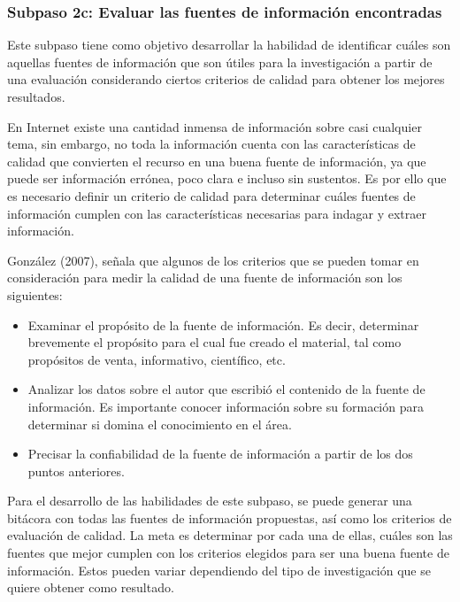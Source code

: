
\subsubsection{Subpaso 2c: Evaluar las fuentes de información encontradas}
\label{secPaso2cCap2}

Este subpaso tiene como objetivo desarrollar la habilidad de identificar cuáles son aquellas fuentes de información que son útiles para la investigación a partir de una evaluación considerando ciertos criterios de calidad para obtener los mejores resultados.

En Internet existe una cantidad inmensa de información sobre casi cualquier tema, sin embargo, no toda la información cuenta con las características de calidad que convierten el recurso en una buena fuente de información, ya que puede ser información errónea, poco clara e incluso sin sustentos. Es por ello que es necesario definir un criterio de calidad para determinar cuáles fuentes de información cumplen con las características necesarias para indagar y extraer información.

González (2007), señala que algunos de los criterios que se pueden tomar en consideración para medir la calidad de una fuente de información son los siguientes:

\begin{itemize}
  \item Examinar el propósito de la fuente de información. Es decir, determinar brevemente el propósito para el cual fue creado el material, tal como propósitos de venta, informativo, científico, etc.
  \item Analizar los datos sobre el autor que escribió el contenido de la fuente de información. Es importante conocer información sobre su formación para determinar si domina el conocimiento en el área.
  \item Precisar la confiabilidad de la fuente de información a partir de los dos puntos anteriores.
\end{itemize}

Para el desarrollo de las habilidades de este subpaso, se puede generar una bitácora con todas las fuentes de información propuestas, así como los criterios de evaluación de calidad. La meta es determinar por cada una de ellas, cuáles son las fuentes que mejor cumplen con los criterios elegidos para ser una buena fuente de información. Estos pueden variar dependiendo del tipo de investigación que se quiere obtener como resultado.

